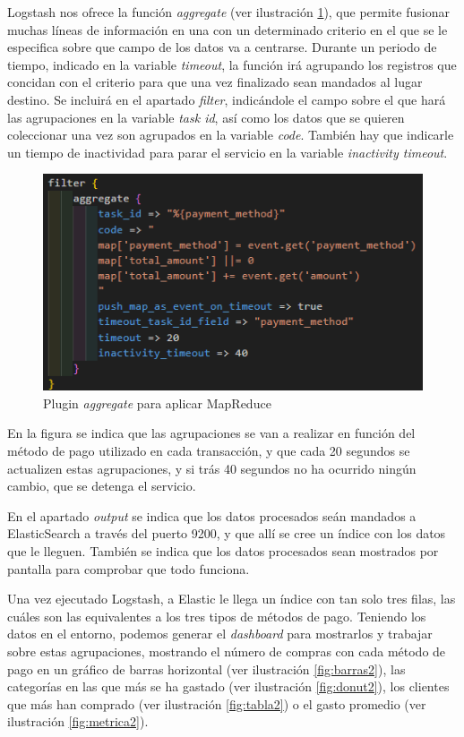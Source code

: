 Logstash nos ofrece la función \textit{aggregate}  (ver ilustración  \ref{fig:aggregate}), que permite fusionar muchas líneas de información en una con un determinado criterio en el que se le especifica sobre que campo de los datos va a centrarse. Durante un periodo de tiempo, indicado en la variable \textit{timeout}, la función irá agrupando los registros que concidan con el criterio para que una vez finalizado sean mandados al lugar destino. Se incluirá en el apartado \textit{filter},  indicándole el campo sobre el que hará las agrupaciones en la variable \textit{task id}, así como los datos que se quieren coleccionar una vez son agrupados en la variable \textit{code}. También hay que indicarle un tiempo de inactividad para parar el servicio en la variable \textit{inactivity timeout}.
\begin{figure}
    \centering
    \includegraphics[width=1\linewidth]{img/aggregate.png}
    \caption{Plugin \textit{aggregate} para aplicar MapReduce}
    \label{fig:aggregate}
\end{figure}

En la figura se indica que las agrupaciones se van a realizar en función del método de pago utilizado en cada transacción, y que cada 20 segundos se actualizen estas agrupaciones, y si trás 40 segundos no ha ocurrido ningún cambio, que se detenga el servicio.

En el apartado \textit{output} se indica que los datos procesados seán mandados a ElasticSearch a través del puerto 9200, y que allí se cree un índice con los datos que le lleguen. También se indica que los datos procesados sean mostrados por pantalla para comprobar que todo funciona.

Una vez ejecutado Logstash, a Elastic le llega un índice con tan solo tres filas, las cuáles son las equivalentes a los tres tipos de métodos de pago. Teniendo los datos en el entorno, podemos generar el \textit{dashboard} para mostrarlos y trabajar sobre estas agrupaciones, mostrando el número de compras con cada método de pago en un gráfico de barras horizontal  (ver ilustración  \ref{fig:barras2}), las categorías en las que más se ha gastado  (ver ilustración  \ref{fig:donut2}), los clientes que más han comprado  (ver ilustración  \ref{fig:tabla2}) o el gasto promedio  (ver ilustración  \ref{fig:metrica2}).

